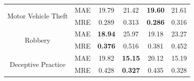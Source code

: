 \begin{table}[th]
\begin{tabular}{|c|c|c|c|c|c|}
		\multirow{2}{*}{Motor Vehicle Theft} & MAE & 19.79 & 21.42 & \textbf{19.60} & 21.61 \\ \cline{2-6}
		& MRE & 0.289 & 0.313 & \textbf{0.286} & 0.316 \\\hline
		\multirow{2}{*}{Robbery} & MAE & \textbf{18.94} & 25.97 & 19.18 & 23.27 \\ \cline{2-6}
		& MRE & \textbf{0.376} & 0.516 & 0.381 & 0.452 \\\hline
		\multirow{2}{*}{Deceptive Practice} & MAE & 19.82 & \textbf{15.15} & 20.12 & 15.19\\ \cline{2-6}
		& MRE & 0.428 & \textbf{0.327} & 0.435 & 0.328\\\hline
	\end{tabular}
\vspace{-3mm}
\end{table}

